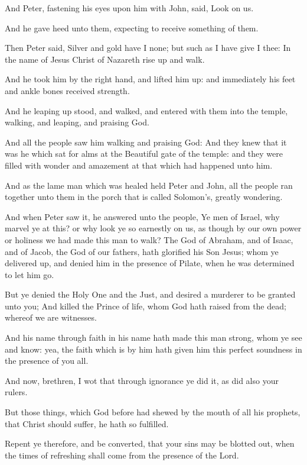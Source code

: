 \Verse And Peter, fastening his eyes upon him with John, said, Look on us.

\Verse And he gave heed unto them, expecting to receive something of them.

\Verse Then Peter said, Silver and gold have I none; but such as I have give I thee: In the name of Jesus Christ of Nazareth rise up and walk.

\Verse And he took him by the right hand, and lifted him up: and immediately his feet and ankle bones received strength.

\Verse And he leaping up stood, and walked, and entered with them into the temple, walking, and leaping, and praising God.

\Verse And all the people saw him walking and praising God: \Verse And they knew that it was he which sat for alms at the Beautiful gate of the temple: and they were filled with wonder and amazement at that which had happened unto him.

\Verse And as the lame man which was healed held Peter and John, all the people ran together unto them in the porch that is called Solomon's, greatly wondering.

\Verse And when Peter saw it, he answered unto the people, Ye men of Israel, why marvel ye at this? or why look ye so earnestly on us, as though by our own power or holiness we had made this man to walk?  \Verse The God of Abraham, and of Isaac, and of Jacob, the God of our fathers, hath glorified his Son Jesus; whom ye delivered up, and denied him in the presence of Pilate, when he was determined to let him go.

\Verse But ye denied the Holy One and the Just, and desired a murderer to be granted unto you; \Verse And killed the Prince of life, whom God hath raised from the dead; whereof we are witnesses.

\Verse And his name through faith in his name hath made this man strong, whom ye see and know: yea, the faith which is by him hath given him this perfect soundness in the presence of you all.

\Verse And now, brethren, I wot that through ignorance ye did it, as did also your rulers.

\Verse But those things, which God before had shewed by the mouth of all his prophets, that Christ should suffer, he hath so fulfilled.

\Verse Repent ye therefore, and be converted, that your sins may be blotted out, when the times of refreshing shall come from the presence of the Lord.

